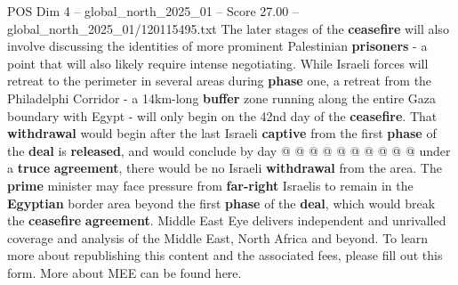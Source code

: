 \begin{textsample}{POS Dim 4 – global\_north\_2025\_01 – Score 27.00 – global\_north\_2025\_01/120115495.txt}
The later stages of the \textbf{ceasefire} will also involve discussing the identities of more prominent Palestinian \textbf{prisoners} - a point that will also likely require intense negotiating.
While Israeli forces will retreat to the perimeter in several areas during \textbf{phase} one, a retreat from the Philadelphi Corridor - a 14km-long \textbf{buffer} zone running along the entire Gaza boundary with Egypt - will only begin on the 42nd day of the \textbf{ceasefire}.
That \textbf{withdrawal} would begin after the last Israeli \textbf{captive} from the first \textbf{phase} of the \textbf{deal} is \textbf{released}, and would conclude by day @ @ @ @ @ @ @ @ @ @ under a \textbf{truce} \textbf{agreement}, there would be no Israeli \textbf{withdrawal} from the area.
The \textbf{prime} minister may face pressure from \textbf{far-right} Israelis to remain in the \textbf{Egyptian} border area beyond the first \textbf{phase} of the \textbf{deal}, which would break the \textbf{ceasefire} \textbf{agreement}.
Middle East Eye delivers independent and unrivalled coverage and analysis of the Middle East, North Africa and beyond.
To learn more about republishing this content and the associated fees, please fill out this form.
More about MEE can be found here.

\end{textsample}
